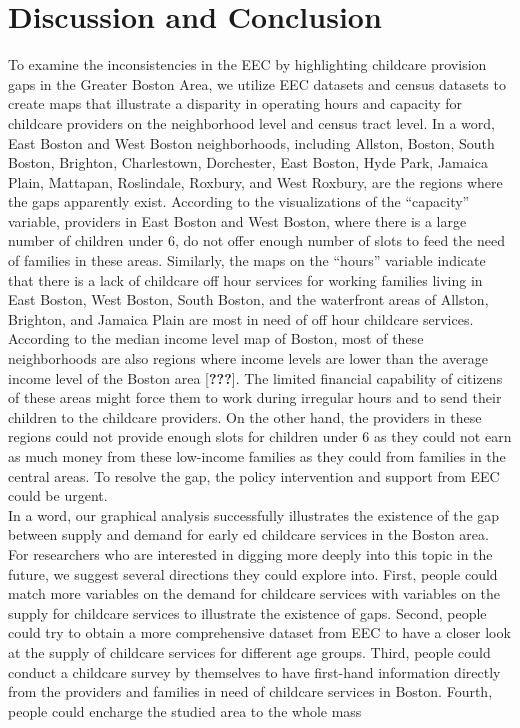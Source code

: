 \documentclass[10pt,letterpaper]{article}
\begin{document}
\section{Discussion and Conclusion}\label{discussion-and-conclusion}

To examine the inconsistencies in the EEC by highlighting childcare
provision gaps in the Greater Boston Area, we utilize EEC datasets and
census datasets to create maps that illustrate a disparity in operating
hours and capacity for childcare providers on the neighborhood level and
census tract level. In a word, East Boston and West Boston
neighborhoods, including Allston, Boston, South Boston, Brighton,
Charlestown, Dorchester, East Boston, Hyde Park, Jamaica Plain,
Mattapan, Roslindale, Roxbury, and West Roxbury, are the regions where
the gaps apparently exist. According to the visualizations of the
``capacity'' variable, providers in East Boston and West Boston, where
there is a large number of children under 6, do not offer enough number
of slots to feed the need of families in these areas. Similarly, the
maps on the ``hours'' variable indicate that there is a lack of
childcare off hour services for working families living in East Boston,
West Boston, South Boston, and the waterfront areas of Allston,
Brighton, and Jamaica Plain are most in need of off hour childcare
services. According to the median income level map of Boston, most of
these neighborhoods are also regions where income levels are lower than
the average income level of the Boston area {[}{\textbf{???}}{]}. The
limited financial capability of citizens of these areas might force them
to work during irregular hours and to send their children to the
childcare providers. On the other hand, the providers in these regions
could not provide enough slots for children under 6 as they could not
earn as much money from these low-income families as they could from
families in the central areas. To resolve the gap, the policy
intervention and support from EEC could be urgent.\\
In a word, our graphical analysis successfully illustrates the existence
of the gap between supply and demand for early ed childcare services in
the Boston area. For researchers who are interested in digging more
deeply into this topic in the future, we suggest several directions they
could explore into. First, people could match more variables on the
demand for childcare services with variables on the supply for childcare
services to illustrate the existence of gaps. Second, people could try
to obtain a more comprehensive dataset from EEC to have a closer look at
the supply of childcare services for different age groups. Third, people
could conduct a childcare survey by themselves to have first-hand
information directly from the providers and families in need of
childcare services in Boston. Fourth, people could encharge the studied
area to the whole mass
\end{document}
